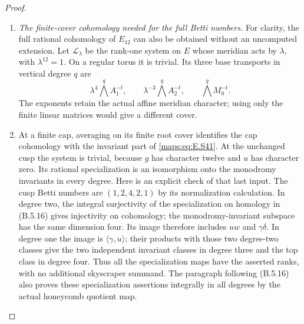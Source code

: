 \begin{proof}
\begin{enumerate}[label=\arabic*.,leftmargin=*]
\item \emph{The finite-cover cohomology needed for the full Betti numbers.}
For clarity, the full rational cohomology of $E_{12}$
can also be obtained without an uncomputed extension.
Let $\mathcal L_\lambda$ be the rank-one system on $E$
whose meridian acts by $\lambda$, with $\lambda^{12}=1$.
On a regular torus it is trivial. Its three base transports
in vertical degree $q$ are
\[
 \lambda^4\bigwedge^q A_1^{-t},\qquad
 \lambda^{-3}\bigwedge^q A_2^{-t},\qquad
                         \bigwedge^q M_0^{-t}.
 \tag{E.S41}\label{maps:eq:E.S41}
\]
The exponents retain the actual affine meridian character;
using only the finite linear matrices would give a different
cover.

\item At a finite cap, averaging on its finite root cover
identifies the cap cohomology with the invariant part of
\eqref{maps:eq:E.S41}. At the unchanged cusp the system is trivial,
because $g$ has character twelve and $u$ has character zero.
Its rational specialization is an isomorphism onto the
monodromy invariants in every degree. Here is an explicit
check of that last input. The cusp Betti numbers are
$(1,2,4,2,1)$ by its normalization calculation. In degree
two, the integral surjectivity of the specialization on
homology in (B.5.16) gives injectivity on cohomology;
the monodromy-invariant subspace has the same dimension
four. Its image therefore includes $uw$ and $\gamma\delta$.
In degree one the image is $\langle\gamma,u\rangle$;
their products with those two degree-two classes give the
two independent invariant classes in degree three and
the top class in degree four. Thus all the specialization
maps have the asserted ranks, with no additional
skyscraper summand. The paragraph following (B.5.16)
also proves these specialization assertions integrally
in all degrees by the actual honeycomb quotient map.


\end{enumerate}
\end{proof}

